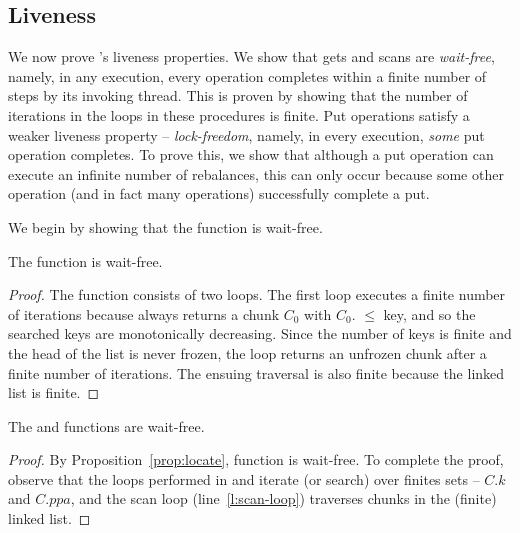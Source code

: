 

\subsection{Liveness}
\label{sec:live}

We now prove \kiwi's liveness properties. 
We show that gets and scans are \emph{wait-free}, namely, in any execution, every operation completes within a finite number of steps by its invoking thread. 
 This is proven  by showing that the number of iterations in the loops in these procedures is finite. 
 Put operations satisfy a weaker liveness property --  \emph{lock-freedom}, namely, in every execution, \emph{some} put operation completes.
To prove this, we show that although a put operation can execute an infinite number of rebalances, this can only occur because 
some other operation (and in fact many operations) successfully complete a put.

We begin by showing that the  function is wait-free. 
\begin{proposition}  
The   function is wait-free.
\label{prop:locate}
\end{proposition}
\begin{proof}
The function consists of two loops. The first loop 
executes a finite number of iterations because  always returns a chunk $C_0$ with $C_0$. $\le$ key,
and so the searched keys are monotonically decreasing.  Since the number of keys is finite and the head of the list is never frozen, the loop
returns an unfrozen chunk after a finite number of iterations. The ensuing traversal is also finite because the linked list is finite. 
\end{proof}

\begin{lemma}
The   and  functions are wait-free.
\end{lemma}
\begin{proof}
By Proposition~\ref{prop:locate},  function is wait-free. 
To complete the proof, observe that the loops performed in  and 
 iterate (or search) over finites sets -- $C.k$ and $C.ppa$, and the scan loop (line~\ref{l:scan-loop}) traverses
 chunks in the (finite) linked list. 
\end{proof}

